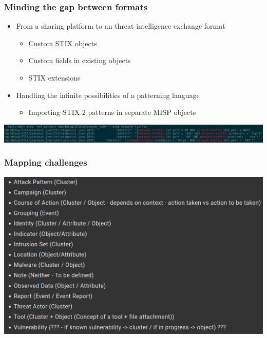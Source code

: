 \begin{frame}
    \frametitle{Minding the gap between formats}
    \begin{itemize}
        \item From a sharing platform to an threat intelligence exchange format
        \begin{itemize}
            \item Custom STIX objects
            \item Custom fields in existing objects
            \item STIX extensions
        \end{itemize}
        \item Handling the infinite possibilities of a patterning language
        \begin{itemize}
            \item Importing STIX 2 patterns in separate MISP objects
        \end{itemize}
    \end{itemize}
    \pause
    \vspace{1em}
    \includegraphics[scale=0.15]{images/patterns.png}
\end{frame}

\begin{frame}
    \frametitle{Mapping challenges}
    \includegraphics[scale=0.285]{images/challenges.png}
\end{frame}

